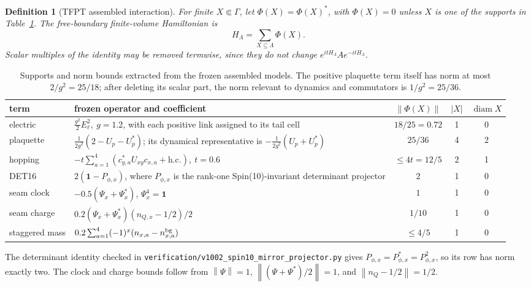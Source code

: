 \documentclass[11pt]{article}
\newtheorem{definition}[theorem]{Definition}
\theoremstyle{remark}
\newcommand{\id}{\mathbf 1}
\newcommand{\diam}{\operatorname{diam}}
\newcommand{\norm}[1]{\left\lVert#1\right\rVert}
\begin{document}
\begin{definition}[TFPT assembled interaction]
For finite \(X\Subset\Gamma\), let \(\Phi(X)=\Phi(X)^*\), with
\(\Phi(X)=0\) unless \(X\) is one of the supports in
Table~\ref{tab:terms}.  The free-boundary finite-volume Hamiltonian is
\[
 H_\Lambda=\sum_{X\subseteq\Lambda}\Phi(X).
\tag{1.4}\label{eq:H}
\]
Scalar multiples of the identity may be removed termwise, since they do
not change \(e^{itH_\Lambda}Ae^{-itH_\Lambda}\).
\end{definition}

\begin{table}[ht]
\centering
\small
\begin{tabularx}{\textwidth}{@{}lXccc@{}}
\toprule
term & frozen operator and coefficient & \(\norm{\Phi(X)}\) & \(|X|\) &
\(\diam X\)\\
\midrule
electric &
\(\frac{g^2}{2}E_\ell^2,\ g=1.2\), with each positive link assigned to
its tail cell & \(18/25=0.72\) & 1 & 0\\
plaquette &
\(\frac1{2g^2}(2-U_p-U_p^*)\); its dynamical representative is
\(-\frac1{2g^2}(U_p+U_p^*)\) & \(25/36\) & 4 & 2\\
hopping &
\(-t\sum_{a=1}^4(c_{y,a}^*U_{xy}c_{x,a}+\mathrm{h.c.}),\ t=0.6\)
& \(\leq4t=12/5\) & 2 & 1\\
DET16 &
\(2(\id-P_{\phi,x})\), where \(P_{\phi,x}\) is the rank-one
Spin(10)-invariant determinant projector & \(2\) & 1 & 0\\
seam clock &
\(-0.5(\Psi_x+\Psi_x^*)\), \(\Psi_x^4=\id\) & \(1\) & 1 & 0\\
seam charge &
\(0.2(\Psi_x+\Psi_x^*) (n_{Q,x}-1/2)/2\) & \(1/10\) & 1 & 0\\
staggered mass &
\(0.2\sum_{a=1}^4(-1)^x(n_{x,a}-n^{\rm bg}_{x,a})\) & \(\leq4/5\) & 1 & 0\\
\bottomrule
\end{tabularx}
\caption{Supports and norm bounds extracted from the frozen assembled
models.  The positive plaquette term itself has norm at most
\(2/g^2=25/18\); after deleting its scalar part, the norm relevant to
dynamics and commutators is \(1/g^2=25/36\).}
\label{tab:terms}
\end{table}

The determinant identity checked in
\texttt{verification/v1002\_spin10\_mirror\_projector.py} gives
\(P_{\phi,x}=P_{\phi,x}^*=P_{\phi,x}^2\), so its row has norm exactly
two.  The clock and charge bounds follow from
\(\norm{\Psi}=1\), \(\norm{(\Psi+\Psi^*)/2}=1\), and
\(\norm{n_Q-1/2}=1/2\).
\end{document}
